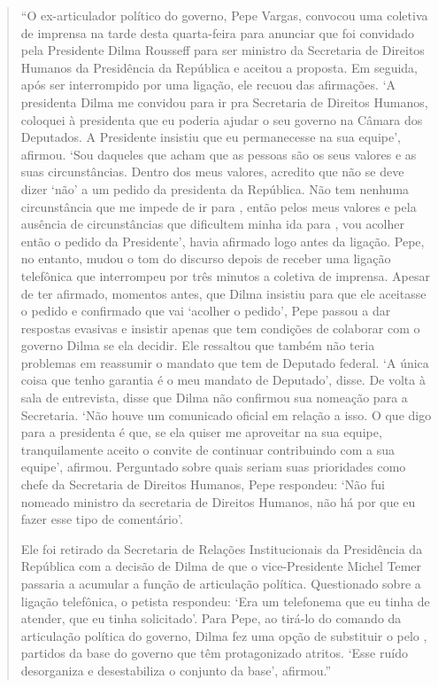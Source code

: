 \asterisc



\begin{quote}
``O ex-articulador político do governo, Pepe Vargas, convocou uma
coletiva de imprensa na tarde desta quarta-feira para anunciar que foi
convidado pela Presidente Dilma Rousseff para ser ministro da
Secretaria de Direitos Humanos da Presidência da República e aceitou a
proposta. Em seguida, após ser interrompido por uma ligação, ele recuou
das afirmações. `A presidenta Dilma me convidou para ir pra Secretaria
de Direitos Humanos, coloquei à presidenta que eu poderia ajudar o seu
governo na Câmara dos Deputados. A Presidente insistiu que eu
permanecesse na sua equipe', afirmou. `Sou daqueles que acham que as
pessoas são os seus valores e as suas circunstâncias. Dentro dos meus
valores, acredito que não se deve dizer `não' a um pedido da presidenta
da República. Não tem nenhuma circunstância que me impede de ir para
, então pelos meus valores e pela ausência de circunstâncias que
dificultem minha ida para , vou acolher então o pedido da
Presidente', havia afirmado logo antes da ligação. Pepe, no entanto,
mudou o tom do discurso depois de receber uma ligação telefônica que
interrompeu por três minutos a coletiva de imprensa. Apesar de ter
afirmado, momentos antes, que Dilma insistiu para que ele aceitasse o
pedido e confirmado que vai `acolher o pedido', Pepe passou a dar
respostas evasivas e insistir apenas que tem condições de colaborar com
o governo Dilma se ela decidir. Ele ressaltou que também não teria
problemas em reassumir o mandato que tem de Deputado federal. `A única
coisa que tenho garantia é o meu mandato de Deputado', disse. De volta à
sala de entrevista, disse que Dilma não confirmou sua nomeação para a
Secretaria. `Não houve um comunicado oficial em relação a isso. O que
digo para a presidenta é que, se ela quiser me aproveitar na sua equipe,
tranquilamente aceito o convite de continuar contribuindo com a sua
equipe', afirmou. Perguntado sobre quais seriam suas prioridades como
chefe da Secretaria de Direitos Humanos, Pepe respondeu: `Não fui
nomeado ministro da secretaria de Direitos Humanos, não há por que eu
fazer esse tipo de comentário'.

Ele foi retirado da Secretaria de
Relações Institucionais da Presidência da República com a decisão de
Dilma de que o vice-Presidente Michel Temer passaria a acumular a função
de articulação política. Questionado sobre a ligação telefônica, o
petista respondeu: `Era um telefonema que eu tinha de atender, que eu
tinha solicitado'. Para Pepe, ao tirá-lo do comando da articulação
política do governo, Dilma fez uma opção de substituir o  pelo ,
partidos da base do governo que têm protagonizado atritos. `Esse ruído
desorganiza e desestabiliza o conjunto da base', afirmou.''
\end{quote}


